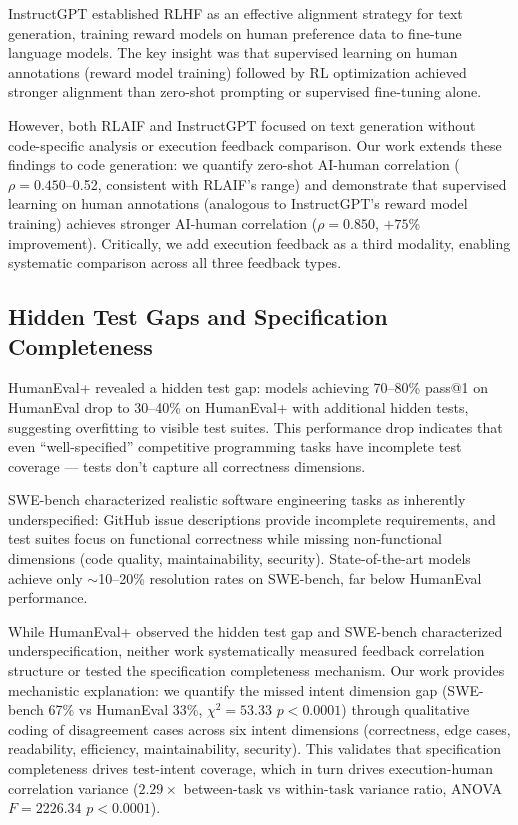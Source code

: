 InstructGPT \cite{ouyang2022training} established RLHF as an effective alignment strategy for text generation, training reward models on human preference data to fine-tune language models. The key insight was that supervised learning on human annotations (reward model training) followed by RL optimization achieved stronger alignment than zero-shot prompting or supervised fine-tuning alone.

However, both RLAIF and InstructGPT focused on text generation without code-specific analysis or execution feedback comparison. Our work extends these findings to code generation: we quantify zero-shot AI-human correlation ($\rho=0.450$--0.52, consistent with RLAIF's range) and demonstrate that supervised learning on human annotations (analogous to InstructGPT's reward model training) achieves stronger AI-human correlation ($\rho=0.850$, $+75\%$ improvement). Critically, we add execution feedback as a third modality, enabling systematic comparison across all three feedback types.

\subsection{Hidden Test Gaps and Specification Completeness}

HumanEval+ \cite{liu2023your} revealed a hidden test gap: models achieving 70--80\% pass@1 on HumanEval drop to 30--40\% on HumanEval+ with additional hidden tests, suggesting overfitting to visible test suites. This performance drop indicates that even ``well-specified'' competitive programming tasks have incomplete test coverage --- tests don't capture all correctness dimensions.

SWE-bench \cite{jimenez2023swe} characterized realistic software engineering tasks as inherently underspecified: GitHub issue descriptions provide incomplete requirements, and test suites focus on functional correctness while missing non-functional dimensions (code quality, maintainability, security). State-of-the-art models achieve only $\sim$10--20\% resolution rates on SWE-bench, far below HumanEval performance.

While HumanEval+ observed the hidden test gap and SWE-bench characterized underspecification, neither work systematically measured feedback correlation structure or tested the specification completeness mechanism. Our work provides mechanistic explanation: we quantify the missed intent dimension gap (SWE-bench 67\% vs HumanEval 33\%, $\chi^2=53.33$ $p<0.0001$) through qualitative coding of disagreement cases across six intent dimensions (correctness, edge cases, readability, efficiency, maintainability, security). This validates that specification completeness drives test-intent coverage, which in turn drives execution-human correlation variance ($2.29\times$ between-task vs within-task variance ratio, ANOVA $F=2226.34$ $p<0.0001$).

